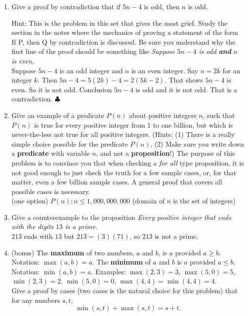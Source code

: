 \documentclass[11pt]{amsart}
\begin{document}
\begin{enumerate}
\item Give a proof by contradiction that if $5n-4$ is odd, then $n$ is odd.

Hint:  This is the problem in this set that gives the most grief.  Study the section
in  the  notes  where  the  mechanics  of  proving  a  statement  of  the  form
If P, then Q by contradiction is discussed.  Be sure you understand why the first line of the proof should be something like {\it Suppose $5n- 4$ is odd {\bfseries and} $n$ is even.}\\[5pt]

{\color{blue} Suppose $5n-4$ is an odd integer and $n$ is an even integer. Say $n = 2k$ for an integer $k$. Then 
$5n-4= 5(2k)-4 = 2(5k-2)$. That shows $5n-4$ is even. So it is not odd. Conclusion $5n-4$ is odd and it is not odd. That is a contradiction.
$\clubsuit$}\\[5pt]

\item  Give an example of a predicate $P(n)$ about positive integers $n$, such that
$P(n)$ is true for every positive integer from 1 to one billion, but which is never-the-less not
true for all positive integers.  (Hints:  (1) There is a really simple choice possible for the predicate
$P(n)$, (2) Make sure you write down a {\bfseries predicate} with variable $n$, and not a {\bf proposition}!)
The purpose of this problem is to convince you that when checking a
{\it for all}
type proposition, it is not good enough to just check the truth for a few sample cases,
or, for that matter, even a few billion sample cases.  A general proof that covers all
possible cases is necessary.\\[5pt]

{\color{blue} (one option) $P(n): n\leq 1,000,000,000$ (domain of $n$ is the set of integers)}\\[5pt] 

\vfill\break

\item Give a counterexample to the proposition {\it Every positive
integer that ends with the digits $13$ is a prime.}\\[5pt]
{\color{blue} $213$ ends with $13$ but $213 = (3)(71)$, so $213$ is not a prime.}\\[5pt]

\item(bonus) 
The {\bfseries maximum} of two numbers, $a$ and $b$, is $a$ provided $a\geq b$. Notation: $\max(a,b) = a$. The {\bfseries minimum}
of $a$ and $b$ is $a$ provided $a\leq b$. Notation: $\min(a,b) = a$.  Examples: $\max(2,3) = 3$, $\max(5,0) = 5$, $\min(2,3) = 2$,
$\min(5,0) = 0$, $\max(4,4) = \min(4,4) = 4$.\\
Give a proof by cases (two cases is the natural choice for this problem)  that for any numbers $s,t$,
\[\min(s,t)+\max(s,t) = s+t.\]\\[5pt]


\end{enumerate}
\end{document}
